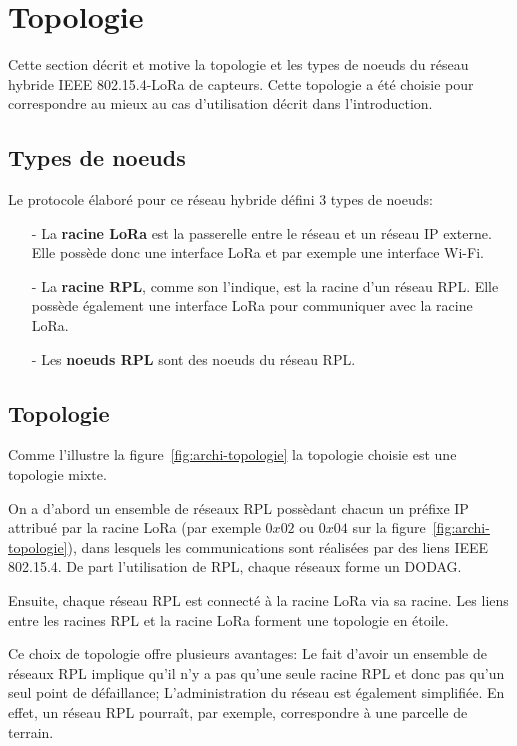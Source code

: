 \section{Topologie}\label{sec:archi-topologie}
\renewcommand{\rightmark}{Topologie}

Cette section décrit et motive la topologie et les types de noeuds du réseau hybride IEEE 802.15.4-LoRa de capteurs. Cette topologie a été choisie pour correspondre au mieux au cas d'utilisation décrit dans l'introduction.

\subsection*{Types de noeuds}
    Le protocole élaboré pour ce réseau hybride défini 3 types de noeuds:
    \begin{itemize}
        \item[-] La \textbf{racine LoRa} est la passerelle entre le réseau et un réseau IP externe. Elle possède donc une interface LoRa et par exemple une interface Wi-Fi.
        \item[-] La \textbf{racine RPL}, comme son l'indique, est la racine d'un réseau RPL. Elle possède également une interface LoRa pour communiquer avec la racine LoRa.
        \item[-] Les \textbf{noeuds RPL} sont des noeuds du réseau RPL.
    \end{itemize}

\subsection*{Topologie}
Comme l'illustre la figure~\ref{fig:archi-topologie} la topologie choisie est une topologie mixte.

On a d'abord un ensemble de réseaux RPL possèdant chacun un préfixe IP attribué par la racine LoRa (par exemple $0x02$ ou $0x04$ sur la figure~\ref{fig:archi-topologie}), dans lesquels les communications sont réalisées par des liens IEEE 802.15.4.
De part l'utilisation de RPL, chaque réseaux forme un DODAG.

Ensuite, chaque réseau RPL est connecté à la racine LoRa via sa racine. Les liens entre les racines RPL et la racine LoRa forment une topologie en étoile.

Ce choix de topologie offre plusieurs avantages: Le fait d'avoir un ensemble de réseaux RPL implique qu'il n'y a pas qu'une seule racine RPL et donc pas qu'un seul point de défaillance; L'administration du réseau est également simplifiée. En effet, un réseau RPL pourraît, par exemple, correspondre à une parcelle de terrain. 

